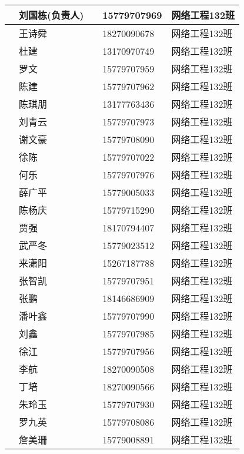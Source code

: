 \documentclass[12pt,a4paper]{article}
\begin{document}
\begin{CJK}{UTF8}{gbsn}
\begin{flushleft}
\begin{longtable}{|l|l|l|l|l|}
           & 刘国栋(负责人) &            & 15779707969 & 网络工程132班  \\ \hline
           & 王诗舜         &            & 18270090678 & 网络工程132班  \\ \hline
           & 杜建           &            & 13170970749 & 网络工程132班  \\ \hline
           & 罗文           &            & 15779707959 & 网络工程132班  \\ \hline
           & 陈建           &            & 15779707962 & 网络工程132班  \\ \hline
           & 陈琪朋         &            & 13177763436 & 网络工程132班  \\ \hline
           & 刘青云         &            & 15779707973 & 网络工程132班  \\ \hline
           & 谢文豪         &            & 15779708090 & 网络工程132班  \\ \hline
           & 徐陈           &            & 15779707022 & 网络工程132班  \\ \hline
           & 何乐           &            & 15779707976 & 网络工程132班  \\ \hline
           & 薛广平         &            & 15779005033 & 网络工程132班  \\ \hline
           & 陈杨庆         &            & 15779715290 & 网络工程132班  \\ \hline
           & 贾强           &            & 18170794407 & 网络工程132班  \\ \hline
           & 武严冬         &            & 15779023512 & 网络工程132班  \\ \hline
           & 来潇阳         &            & 15267187788 & 网络工程132班  \\ \hline
           & 张智凯         &            & 15779707951 & 网络工程132班  \\ \hline
           & 张鹏           &            & 18146686909 & 网络工程132班  \\ \hline
           & 潘叶鑫         &            & 15779707990 & 网络工程132班  \\ \hline
           & 刘鑫           &            & 15779707985 & 网络工程132班  \\ \hline
           & 徐江           &            & 15779707956 & 网络工程132班  \\ \hline
           & 李航           &            & 18270090508 & 网络工程132班  \\ \hline
           & 丁培           &            & 18270090566 & 网络工程132班  \\ \hline
           & 朱玲玉         &            & 15779707930 & 网络工程132班  \\ \hline
           & 罗九英         &            & 15779708086 & 网络工程132班  \\ \hline
           & 詹美珊         &            & 15779008891 & 网络工程132班  \\ \hline


\end{longtable}
\end{flushleft}
\end{CJK}
\end{document}
